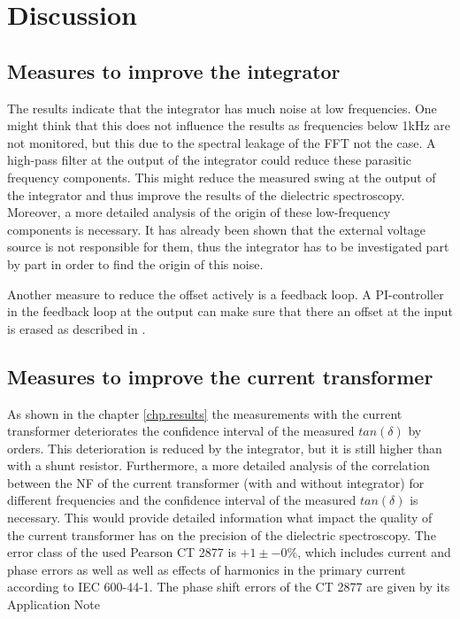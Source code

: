 \chapter{Discussion}

\section{Measures to improve the integrator}
The results indicate that the integrator has much noise at low frequencies. One might think that this does not influence the results as frequencies below 1kHz are not monitored, but this due to the spectral leakage of the FFT not the case.  A high-pass filter at the output of the integrator could reduce these parasitic frequency components. This might reduce the measured swing at the output of the integrator and thus improve the results of the dielectric spectroscopy. 
Moreover, a more detailed analysis of the origin of these low-frequency components is necessary. It has already been shown that the external voltage source is not responsible for them, thus the integrator has to be investigated part by part in order to find the origin of this noise. 

Another measure to reduce the offset actively is a feedback loop. A PI-controller in the feedback loop at the output can make sure that there an offset at the input is erased as described in \cite{thomas}. 

\section{Measures to improve the current transformer}
As shown in the chapter \ref{chp.results} the measurements with the current transformer deteriorates the confidence interval of the measured $tan(\delta)$ by orders. This deterioration is reduced by the integrator, but it is still higher than with a shunt resistor. 
Furthermore, a more detailed analysis of the correlation between the NF of the current transformer (with and without integrator) for different frequencies and the confidence interval of the measured $tan(\delta)$ is necessary. This would provide detailed information what impact the quality of the current transformer has on the precision of the dielectric spectroscopy. 
The error class of the used Pearson CT 2877 is $+1\pm-0\%$, which includes current and phase errors as well as well as effects of harmonics in the primary current according to IEC 600-44-1. The phase shift errors of the CT 2877 are given by its Application Note %